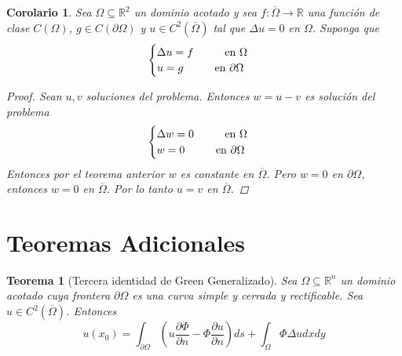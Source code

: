 \documentclass[11pt]{book}
\theoremstyle{plain}
\newtheorem{teo}[proposición]{Teorema}
\newtheorem{coro}[proposición]{Corolario}
\theoremstyle{definition}
\newcommand{\R}{\mathbb{R}}
\begin{document}
    \begin{coro}
        Sea $\Omega \subseteq \R^{2}$ un dominio acotado y sea $f: \overline{\Omega} \to \R$ una función de clase $C(\Omega)$, $g\in C(\partial \Omega)$ y $u \in C^{2}(\overline{\Omega})$ tal que $\Delta u = 0$ en $\Omega$. Suponga que
        \[
            \begin{cases}
                \Delta u = f \hspace{10mm} \text{en } \Omega\\
                u = g \hspace{10mm} \text{en } \partial \Omega
            \end{cases}
        \]
        \begin{proof}
            Sean $u, v$ soluciones del problema. Entonces $w = u - v$ es solución del problema
            \[
                \begin{cases}
                    \Delta w = 0 \hspace{10mm} \text{en } \Omega\\
                    w = 0 \hspace{10mm} \text{en } \partial \Omega
                \end{cases}
            \]
            Entonces por el teorema anterior $w$ es constante en $\overline{\Omega}$. Pero $w = 0$ en $\partial \Omega$, entonces $w = 0$ en $\overline{\Omega}$. Por lo tanto $u = v$ en $\overline{\Omega}$.
        \end{proof}
    \end{coro}

    \section{Teoremas Adicionales}
    \begin{teo}[Tercera identidad de Green Generalizado]
        Sea $\Omega \subseteq \R^{n}$ un dominio acotado cuya frontera $\partial \Omega$ es una curva simple y cerrada y rectificable. Sea $u \in C^{2}(\overline{\Omega})$. Entonces
        \[
            u(x_{0}) = \int_{\partial \Omega} \left(u \frac{\partial \Phi}{\partial n} - \Phi \frac{\partial u}{\partial n}\right)ds + \int_{\Omega} \Phi \Delta u dxdy
        \]
    \end{teo}
\end{document}
